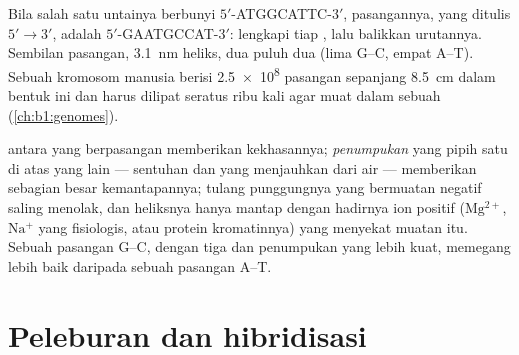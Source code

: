 \begin{example}\label{ex:b1:nucleic-acids:complement}
Bila salah satu untainya berbunyi $5'$-ATGGCATTC-$3'$, pasangannya,
yang ditulis $5' \to 3'$, adalah $5'$-GAATGCCAT-$3'$: lengkapi tiap
, lalu balikkan urutannya. Sembilan pasangan, \qty{3.1}{nm}
heliks, dua puluh dua  (lima G--C, empat A--T). Sebuah
kromosom manusia berisi \num{2.5e8} pasangan sepanjang \qty{8.5}{cm}
dalam bentuk ini dan harus dilipat seratus ribu kali agar muat dalam
sebuah  (\cref{ch:b1:genomes}).
\end{example}

\begin{proposition}\label{prop:b1:nucleic-acids:stability}
 antara  yang berpasangan memberikan kekhasannya;
\emph{penumpukan}  yang pipih satu di atas
yang lain --- sentuhan  dan  yang menjauhkan
 dari air --- memberikan sebagian besar kemantapannya; tulang
punggungnya yang bermuatan negatif saling menolak, dan heliksnya hanya
mantap dengan hadirnya ion positif ($\mathrm{Mg^{2+}}$,
$\mathrm{Na^+}$ yang fisiologis, atau protein  kromatinnya) yang
menyekat muatan itu. Sebuah pasangan G--C, dengan tiga 
dan penumpukan yang lebih kuat, memegang lebih baik daripada sebuah
pasangan A--T.
\end{proposition}

\section{Peleburan dan hibridisasi}

